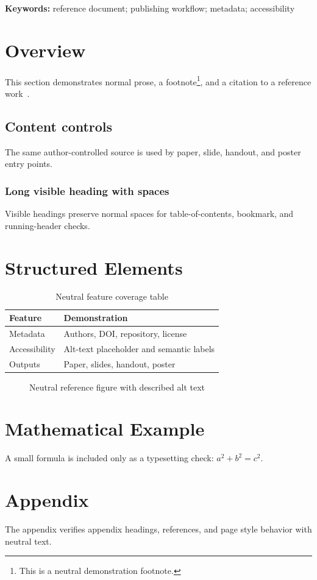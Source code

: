 \begin{abstract}
This neutral reference document demonstrates INSR publication-layout features using non-claim demo text. It is not a scientific result and does not make clinical efficacy claims.
\end{abstract}
\noindent\textbf{Keywords:} reference document; publishing workflow; metadata; accessibility

\section{Overview}
This section demonstrates normal prose, a footnote\footnote{This is a neutral demonstration footnote.}, and a citation to a reference work~\cite{doe2026demoarticle}.
\subsection{Content controls}
The same author-controlled source is used by paper, slide, handout, and poster entry points.
\subsubsection{Long visible heading with spaces}
Visible headings preserve normal spaces for table-of-contents, bookmark, and running-header checks.

\section{Structured Elements}
\begin{table}[htbp]
\centering
\caption{Neutral feature coverage table}
\begin{tabular}{ll}
\toprule
Feature & Demonstration \\
\midrule
Metadata & Authors, DOI, repository, license \\
Accessibility & Alt-text placeholder and semantic labels \\
Outputs & Paper, slides, handout, poster \\
\bottomrule
\end{tabular}
\end{table}

\begin{figure}[htbp]
\centering
{}
\caption{Neutral reference figure with described alt text}
\end{figure}

\section{Mathematical Example}
A small formula is included only as a typesetting check: \( a^2 + b^2 = c^2 \).

\appendix
\section{Appendix}
The appendix verifies appendix headings, references, and page style behavior with neutral text.
\INSRPrintBibliography
